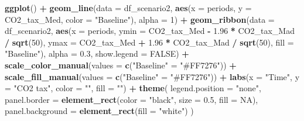 \documentclass[
]{article}
\newenvironment{Shaded}{\begin{snugshade}}{\end{snugshade}}
\newcommand{\AttributeTok}[1]{\textcolor[rgb]{0.13,0.29,0.53}{#1}}
\newcommand{\ConstantTok}[1]{\textcolor[rgb]{0.56,0.35,0.01}{#1}}
\newcommand{\DecValTok}[1]{\textcolor[rgb]{0.00,0.00,0.81}{#1}}
\newcommand{\FloatTok}[1]{\textcolor[rgb]{0.00,0.00,0.81}{#1}}
\newcommand{\FunctionTok}[1]{\textcolor[rgb]{0.13,0.29,0.53}{\textbf{#1}}}
\newcommand{\NormalTok}[1]{#1}
\newcommand{\OtherTok}[1]{\textcolor[rgb]{0.56,0.35,0.01}{#1}}
\newcommand{\SpecialCharTok}[1]{\textcolor[rgb]{0.81,0.36,0.00}{\textbf{#1}}}
\newcommand{\StringTok}[1]{\textcolor[rgb]{0.31,0.60,0.02}{#1}}
\begin{document}
\begin{Shaded}
\begin{Highlighting}[]
\FunctionTok{ggplot}\NormalTok{() }\SpecialCharTok{+}
  \FunctionTok{geom\_line}\NormalTok{(}\AttributeTok{data =}\NormalTok{ df\_scenario2, }\FunctionTok{aes}\NormalTok{(}\AttributeTok{x =}\NormalTok{ periods, }\AttributeTok{y =}\NormalTok{ CO2\_tax\_Med, }\AttributeTok{color =} \StringTok{"Baseline"}\NormalTok{), }\AttributeTok{alpha =} \DecValTok{1}\NormalTok{) }\SpecialCharTok{+}
  \FunctionTok{geom\_ribbon}\NormalTok{(}\AttributeTok{data =}\NormalTok{ df\_scenario2, }\FunctionTok{aes}\NormalTok{(}\AttributeTok{x =}\NormalTok{ periods, }\AttributeTok{ymin =}\NormalTok{ CO2\_tax\_Med }\SpecialCharTok{{-}} \FloatTok{1.96} \SpecialCharTok{*}\NormalTok{ CO2\_tax\_Mad }\SpecialCharTok{/} \FunctionTok{sqrt}\NormalTok{(}\DecValTok{50}\NormalTok{), }
                                      \AttributeTok{ymax =}\NormalTok{ CO2\_tax\_Med }\SpecialCharTok{+} \FloatTok{1.96} \SpecialCharTok{*}\NormalTok{ CO2\_tax\_Mad }\SpecialCharTok{/} \FunctionTok{sqrt}\NormalTok{(}\DecValTok{50}\NormalTok{), }\AttributeTok{fill =} \StringTok{"Baseline"}\NormalTok{), }
              \AttributeTok{alpha =} \FloatTok{0.3}\NormalTok{, }\AttributeTok{show.legend =} \ConstantTok{FALSE}\NormalTok{) }\SpecialCharTok{+}
  \FunctionTok{scale\_color\_manual}\NormalTok{(}\AttributeTok{values =} \FunctionTok{c}\NormalTok{(}\StringTok{"Baseline"} \OtherTok{=} \StringTok{"\#FF7276"}\NormalTok{)) }\SpecialCharTok{+}
  \FunctionTok{scale\_fill\_manual}\NormalTok{(}\AttributeTok{values =} \FunctionTok{c}\NormalTok{(}\StringTok{"Baseline"} \OtherTok{=} \StringTok{"\#FF7276"}\NormalTok{)) }\SpecialCharTok{+}
  \FunctionTok{labs}\NormalTok{(}\AttributeTok{x =} \StringTok{"Time"}\NormalTok{, }\AttributeTok{y =} \StringTok{"CO2 tax"}\NormalTok{, }\AttributeTok{color =} \StringTok{""}\NormalTok{, }\AttributeTok{fill =} \StringTok{""}\NormalTok{) }\SpecialCharTok{+}
  \FunctionTok{theme}\NormalTok{(}
    \AttributeTok{legend.position =} \StringTok{"none"}\NormalTok{,}
    \AttributeTok{panel.border =} \FunctionTok{element\_rect}\NormalTok{(}\AttributeTok{color =} \StringTok{"black"}\NormalTok{, }\AttributeTok{size =} \FloatTok{0.5}\NormalTok{, }\AttributeTok{fill =} \ConstantTok{NA}\NormalTok{),}
    \AttributeTok{panel.background =} \FunctionTok{element\_rect}\NormalTok{(}\AttributeTok{fill =} \StringTok{"white"}\NormalTok{)}
\NormalTok{  )}
\end{Highlighting}
\end{Shaded}
\end{document}
